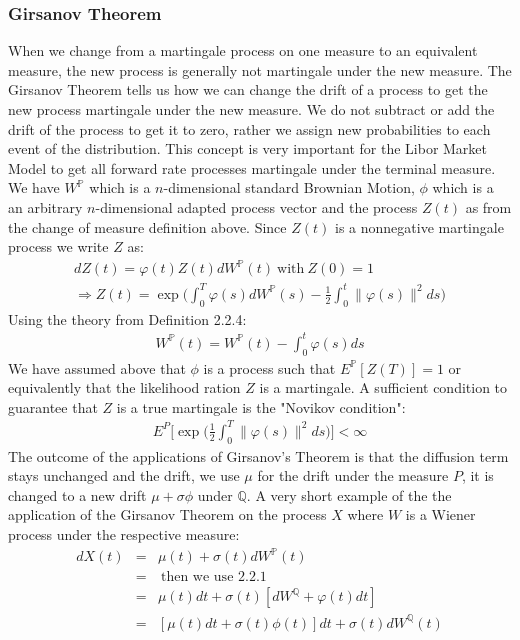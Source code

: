 \documentclass[11pt]{article}
\numberwithin{equation}{subsection}
\begin{document}
\subsubsection{Girsanov Theorem}
When we change from a martingale process on one measure to an equivalent measure, the new process is generally not martingale under the new measure. The Girsanov Theorem tells us how we can change the drift of a process to get the new process martingale under the new measure. We do not subtract or add the drift of the process to get it to zero, rather we assign new probabilities to each event of the distribution. This concept is very important for the Libor Market Model to get all forward rate processes martingale under the terminal measure.\\
We have \(W^\mathbb{P}\) which is a \(n\)-dimensional standard Brownian Motion, \(\phi\) which is a an arbitrary \(n\)-dimensional adapted process vector and the process \(Z(t)\) as from the change of measure definition above. Since \(Z(t)\) is a nonnegative martingale process we write \(Z\) as: 
\begin{eqnarray*}
	dZ(t)  = \varphi(t) Z(t) dW^\mathbb{P}(t) \ \text{with} \ Z(0) = 1 \\
	\Rightarrow	Z(t)  = \exp\bigg(\int_{0}^{T} \varphi(s)dW^\mathbb{P}(s) - \frac{1}{2} \int_{0}^{t} \|\varphi(s)\|^2 ds\bigg)
\end{eqnarray*}
Using the theory from Definition 2.2.4:
\begin{eqnarray}
W^\mathbb{P}(t) = W^\mathbb{P}(t) - \int_{0}^{t} \varphi(s)ds
\end{eqnarray}
We have assumed above that \(\phi\) is a process such that \(E^\mathbb{P}[Z(T)]=1\) or equivalently that the likelihood ration \(Z\) is a martingale. A sufficient condition to guarantee that \(Z\) is a true martingale is the "Novikov condition":
\begin{eqnarray}
	E^P\bigg[\exp\bigg(\frac{1}{2} \int_{0}^{T} \|\varphi(s)\|^2 ds\bigg)\bigg] < \infty
\end{eqnarray}
The outcome of the applications of Girsanov's Theorem is that the diffusion term stays unchanged and the drift, we use \(\mu\) for the drift under the measure \(P\), it is changed to a new drift \(\mu + \sigma \phi\) under \(\mathbb{Q}\). A very short example of the the application of the Girsanov Theorem on the process \(X\) where \(W\) is a Wiener process under the respective measure:
\begin{eqnarray*}
	dX(t) &=& \mu(t) + \sigma(t) dW^{\mathbb{P}}(t) \\
	 &=& \ \text{then we use 2.2.1} \\
	 &=& \mu(t) dt + \sigma(t)[dW^{\mathbb{Q}} + \varphi(t)dt] \\
	 &=& [\mu(t) dt + \sigma(t)\phi(t)]dt + \sigma(t) dW^{\mathbb{Q}}(t)
\end{eqnarray*}
\end{document}
